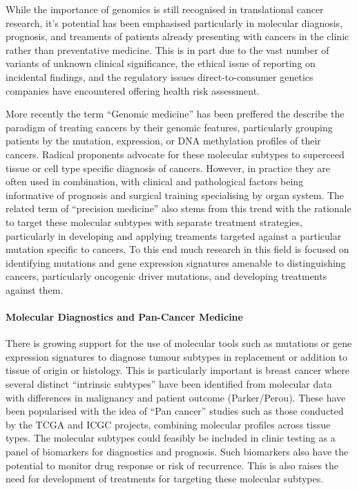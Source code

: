 While the importance of genomics is still recognised in translational cancer research, it's potential has been emphasised particularly in molecular diagnosis, prognosis, and treaments of patients already presenting with cancers in the clinic rather than preventative medicine. This is in part due to the vast number of variants of unknown clinical significance, the ethical issue of reporting on incidental findings, and the regulatory issues direct-to-consumer genetics companies have encountered offering health risk assessment.

More recently the term ``Genomic medicine'' has been preffered the describe the paradigm of treating cancers by their genomic features, particularly grouping patients by the mutation, expression, or DNA methylation profiles of their cancers. Radical proponents advocate for these molecular subtypes to superceed tissue or cell type specific diagnosis of cancers. However, in practice they are often used in combination, with clinical and pathological factors being informative of prognosis and surgical training specialising by organ system. The related term of ``precision medicine'' also stems from this trend with the rationale to target these molecular subtypes with separate treatment strategies, particularly in developing and applying treaments targeted against a particular mutation specific to cancers. To this end much research in this field is focused on identifying mutations and gene expression signatures amenable to distinguishing cancers, particularly oncogenic driver mutations, and developing treatments against them.

\paragraph{Molecular Diagnostics and Pan-Cancer Medicine}
There is growing support for the use of molecular tools such as mutations or gene expression signatures to diagnose tumour subtypes in replacement or addition to tissue of origin or histology. This is particularly important is breast cancer where several distinct ``intrinsic subtypes'' have been identified from molecular data with differences in malignancy and patient outcome (Parker/Perou). These have been popularised with the idea of ``Pan cancer'' studies such as those conducted by the TCGA and ICGC projects, combining molecular profiles across tissue types. The molecular subtypes could feasibly be included in clinic testing as a panel of biomarkers for diagnostics and prognosis. Such biomarkers also have the potential to monitor drug response or risk of recurrence. This is also raises the need for development of treatments for targeting these molecular subtypes.  

